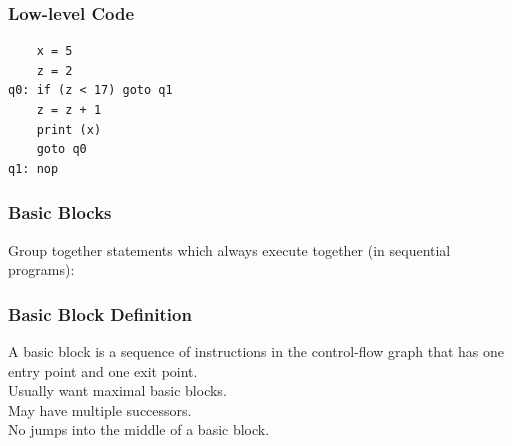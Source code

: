 \documentclass{beamer}
\newenvironment{changemargin}[1]{%
  \begin{list}{}{%
    \setlength{\topsep}{0pt}%
    \setlength{\leftmargin}{#1}%
    \setlength{\rightmargin}{1em}
    \setlength{\listparindent}{\parindent}%
    \setlength{\itemindent}{\parindent}%
    \setlength{\parsep}{\parskip}%
  }%
  \item[]}{\end{list}}
\begin{document}
\begin{frame}[fragile]
  \frametitle{Low-level Code}

\begin{changemargin}{2em}
\begin{lstlisting}
    x = 5
    z = 2
q0: if (z < 17) goto q1
    z = z + 1
    print (x)
    goto q0
q1: nop
\end{lstlisting}
\end{changemargin}
\end{frame}

\begin{frame}
  \frametitle{Basic Blocks}
\begin{changemargin}{2cm}
  Group together
  statements which always execute together (in sequential programs):
\end{changemargin}

\begin{center}
\end{center}
\end{frame}

\begin{frame}
  \frametitle{Basic Block Definition}
  \begin{changemargin}{1cm}
    A \alert{basic block} is a sequence of instructions in the control-flow graph
    that has one entry point and one exit point.\\[1em]

    Usually want maximal basic blocks.\\[1em]

    May have multiple successors.\\[1em]

    No jumps into the middle of a basic block.
  \end{changemargin}
\end{frame}
\end{document}
